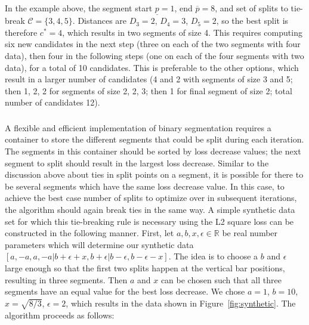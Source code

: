 \documentclass[algorithms,article,accept,oneauthor]{Definitions/mdpi}
\begin{document}
In the example above, the segment start $\underline p=1$, end $\overline p=8$, and set of splits to tie-break $\mathcal C=\{3,4,5\}$. 
Distances are $D_3=2$, $D_4=3$, $D_5=2$, so the best split is therefore $c^* = 4$, which results in two segments of size 4.
This requires computing six new candidates in the next step (three on each of the two segments with four data), then four in the following steps (one on each of the four segments with two data), for a total of 10 candidates.
This is preferable to the other options, which result in a larger number of candidates (4 and 2 with segments of size 3 and 5; then 1, 2, 2 for segments of size 2, 2, 3; then 1 for final segment of size 2; total number of candidates 12).

\subsubsection{} 
A flexible and efficient implementation of binary segmentation requires a container to store the different segments that could be split during each iteration. 
The segments in this container should be sorted by loss decrease values; the next segment to split should result in the largest loss decrease.
Similar to the discussion above about ties in split points on a segment, it is possible for there to be several segments which have the same loss decrease value. 
In this case, to achieve the best case number of splits to optimize over in subsequent iterations, the algorithm should again break ties in the same way. 
A simple synthetic data set for which this tie-breaking rule is necessary using the L2 square loss can be constructed in the following manner. 
First, let $a,b,x,\epsilon\in\mathbb R$ be real number parameters which will determine our synthetic data  $[a,-a,a,-a|b+\epsilon+x,b+\epsilon|b-\epsilon,b-\epsilon-x]$.
The idea is to choose a $b$ and $\epsilon$ large enough so that the first two splits happen at the vertical bar positions, resulting in three segments.
Then $a$ and $x$ can be chosen such that all three segments have an equal value for the best loss decrease. 
We chose $a=1$, $b=10$, $x=\sqrt{8/3}$, $\epsilon=2$, which results in the data shown in Figure~\ref{fig:synthetic}.
The algorithm proceeds as follows:
\end{document}
